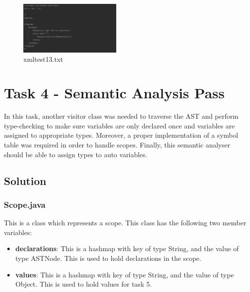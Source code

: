 \documentclass{article}
\begin{document}
\begin{multicols}{2}
					\begin{figure}[H]
					\centering
			 			\includegraphics[width=0.45\textwidth]{xmltest13.png}
			 			\centering
			  			\caption{xmltest13.txt}
			  			\label{fig:xmltest13}
					\end{figure}
					
			\end{multicols}
			
			\section{Task 4 - Semantic Analysis Pass}
			
			In this task, another visitor class was needed to traverse the AST and perform type-checking to make sure variables are only declared once and variables are assigned to appropriate types. Moreover, a proper implementation of a symbol table was required in order to handle scopes. Finally, this semantic analyser should be able to assign types to auto variables.
			
			\subsection{Solution}
			
			\subsubsection{Scope.java}
			
			This is a class which represents a scope. This class has the following two member variables:
			\begin{itemize}
			\item \textbf{declarations}: This is a hashmap with key of type String, and the value of type ASTNode. This is used to hold declarations in the scope.
			\item \textbf{values}: This is a hashmap with key of type String, and the value of type Object. This is used to hold values for task 5.
			\end{itemize}
			
\end{document}
